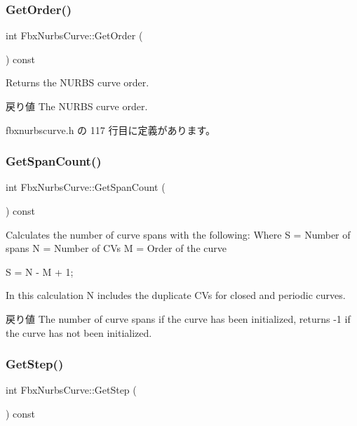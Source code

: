 \subsubsection{\texorpdfstring{Get\+Order()}{GetOrder()}}
{\footnotesize\ttfamily int Fbx\+Nurbs\+Curve\+::\+Get\+Order (\begin{DoxyParamCaption}{ }\end{DoxyParamCaption}) const\hspace{0.3cm}{\ttfamily [inline]}}

Returns the N\+U\+R\+BS curve order. \begin{DoxyReturn}{戻り値}
The N\+U\+R\+BS curve order. 
\end{DoxyReturn}


 fbxnurbscurve.\+h の 117 行目に定義があります。

\mbox{\label{class_fbx_nurbs_curve_acb1cf2016f20b2a0c8df382046c7d3ea}} 
\subsubsection{\texorpdfstring{Get\+Span\+Count()}{GetSpanCount()}}
{\footnotesize\ttfamily int Fbx\+Nurbs\+Curve\+::\+Get\+Span\+Count (\begin{DoxyParamCaption}{ }\end{DoxyParamCaption}) const}

Calculates the number of curve spans with the following\+: Where S = Number of spans N = Number of C\+Vs M = Order of the curve

S = N -\/ M + 1;

In this calculation N includes the duplicate C\+Vs for closed and periodic curves.

\begin{DoxyReturn}{戻り値}
The number of curve spans if the curve has been initialized, returns -\/1 if the curve has not been initialized. 
\end{DoxyReturn}
\mbox{\label{class_fbx_nurbs_curve_ac1ab9cfbac264cb9ab92dcc9b2149448}} 
\subsubsection{\texorpdfstring{Get\+Step()}{GetStep()}}
{\footnotesize\ttfamily int Fbx\+Nurbs\+Curve\+::\+Get\+Step (\begin{DoxyParamCaption}{ }\end{DoxyParamCaption}) const\hspace{0.3cm}{\ttfamily [inline]}}


